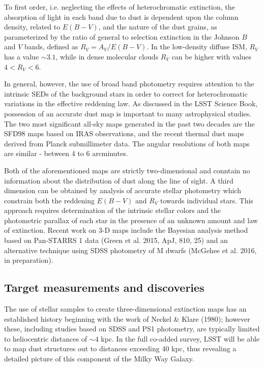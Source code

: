 To first order, i.e. neglecting the effects of heterochromatic
extinction, the absorption of light in each band due to dust is
dependent upon the column density, related to $E(B-V)$, and the nature
of the dust grains, as parameterized by the ratio of general to
selection extinction in the Johnson $B$ and $V$ bands, defined as $R_V
= A_V /E(B − V)$.  In the low-density diffuse ISM, $R_V$ has a value
$\sim 3.1$, while in dense molecular clouds $R_V$ can be higher with
values $4 < R_V < 6$.


In general, however, the use of broad band photometry requires
attention to the intrinsic SEDs of the background stars in order to
correct for heterochromatic variations in the effective reddening
law. As discussed in the LSST Science Book, possession of an accurate
dust map is important to many astrophysical studies. The two most
significant all-sky maps generated in the past two decades are the
SFD98 maps based on IRAS observations, and the recent thermal dust
maps derived from Planck submillimeter data. The angular resolutions
of both maps are similar - between 4 to 6 arcminutes.

Both of the aforementioned maps are strictly two-dimensional and
conntain no information about the distribution of dust along the line
of sight. A third dimension can be obtained by analysis of accurate
stellar photometry which constrain both the reddening $E(B-V)$ and
$R_V$ towards individual stars. This approach requires determination
of the intrinsic stellar colors and the photometric parallax of each
star in the presence of an unknown amount and law of extinction.
Recent work on 3-D maps include the Bayesian analysis method based on
Pan-STARRS 1 data (Green et al. 2015, ApJ, 810, 25) and an alternative
technique using SDSS photometry of M dwarfs (McGehee et al. 2016, in
preparation).


\subsection{Target measurements and discoveries}
\label{sec:\secname:targets}

The use of stellar samples to create three-dimensional extinction maps has an established history
beginning with the work of Neckel \& Klare (1980); however these, including studies based on SDSS and
PS1 photometry, are typically limited to heliocentric distances of $\sim$4 kpc. In the full co-added survey,
LSST will be able to map dust structures out to distances exceeding 40 kpc, thus revealing a
detailed picture of this component of the Milky Way Galaxy.

